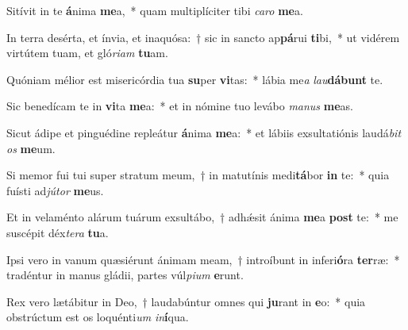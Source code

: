 \item Sitívit in te \textbf{á}nima \textbf{me}a,~* quam multiplíciter tibi \textit{ca}\textit{ro} \textbf{me}a.
\item In terra desérta, et ínvia, et inaquósa:~† sic in sancto ap\textbf{pá}rui \textbf{ti}bi,~* ut vidérem virtútem tuam, et gló\textit{ri}\textit{am} \textbf{tu}am.
\item Quóniam mélior est misericórdia tua \textbf{su}per \textbf{vi}tas:~* lábia me\textit{a} \textit{lau}\textbf{dá}\textbf{bunt} te.
\item Sic benedícam te in \textbf{vi}ta \textbf{me}a:~* et in nómine tuo levábo \textit{ma}\textit{nus} \textbf{me}as.
\item Sicut ádipe et pinguédine repleátur \textbf{á}nima \textbf{me}a:~* et lábiis exsultatiónis laudá\textit{bit} \textit{os} \textbf{me}um.
\item Si memor fui tui super stratum meum,~† in matutínis medi\textbf{tá}bor \textbf{in} te:~* quia fuísti ad\textit{jú}\textit{tor} \textbf{me}us.
\item Et in velaménto alárum tuárum exsultábo,~† adhǽsit ánima \textbf{me}a \textbf{post} te:~* me suscépit déx\textit{te}\textit{ra} \textbf{tu}a.
\item Ipsi vero in vanum quæsiérunt ánimam meam,~† introíbunt in inferi\textbf{ó}ra \textbf{ter}ræ:~* tradéntur in manus gládii, partes vúl\textit{pi}\textit{um} \textbf{e}runt.
\item Rex vero lætábitur in Deo,~† laudabúntur omnes qui \textbf{ju}rant in \textbf{e}o:~* quia obstrúctum est os loquénti\textit{um} \textit{in}\textbf{í}qua.
